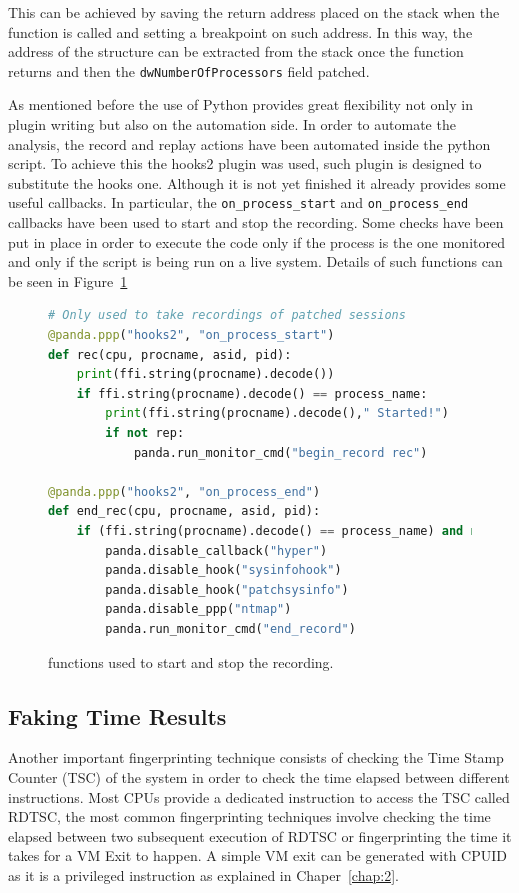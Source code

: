 This can be achieved by saving the return address placed on the stack when the function is called and setting a breakpoint on such address. In this way, the address of the structure can be extracted from the stack once the function returns and then the \lstinline{dwNumberOfProcessors} field patched.  


As mentioned before the use of Python provides great flexibility not only in plugin writing but also on the automation side. In order to automate the analysis, the record and replay actions have been automated inside the python script. To achieve this the hooks2 plugin was used, such plugin is designed to substitute the hooks one. Although it is not yet finished it already provides some useful callbacks. In particular, the \lstinline{on_process_start} and \lstinline{on_process_end} callbacks have been used to start and stop the recording. Some checks have been put in place in order to execute the code only if the process is the one monitored and only if the script is being run on a live system. Details of such functions can be seen in Figure~\ref{fig:startstop}

\begin{figure}[htp]
\centering
\begin{lstlisting}[language=Python] 
# Only used to take recordings of patched sessions
@panda.ppp("hooks2", "on_process_start")
def rec(cpu, procname, asid, pid):
    print(ffi.string(procname).decode())
    if ffi.string(procname).decode() == process_name:
        print(ffi.string(procname).decode()," Started!")
        if not rep:
            panda.run_monitor_cmd("begin_record rec")

@panda.ppp("hooks2", "on_process_end")
def end_rec(cpu, procname, asid, pid):
    if (ffi.string(procname).decode() == process_name) and not rep:
        panda.disable_callback("hyper")
        panda.disable_hook("sysinfohook")
        panda.disable_hook("patchsysinfo")
        panda.disable_ppp("ntmap")
        panda.run_monitor_cmd("end_record")
\end{lstlisting}
\caption{functions used to start and stop the recording.}
\label{fig:startstop}
\end{figure}


\subsection{Faking Time Results}

Another important fingerprinting technique consists of checking the Time Stamp Counter (TSC) of the system in order to check the time elapsed between different instructions. Most CPUs provide a dedicated instruction to access the TSC called RDTSC, the most common fingerprinting techniques involve checking the time elapsed between two subsequent execution of RDTSC or fingerprinting the time it takes for a VM Exit to happen. A simple VM exit can be generated with CPUID as it is a privileged instruction as explained in Chaper~\ref{chap:2}.

